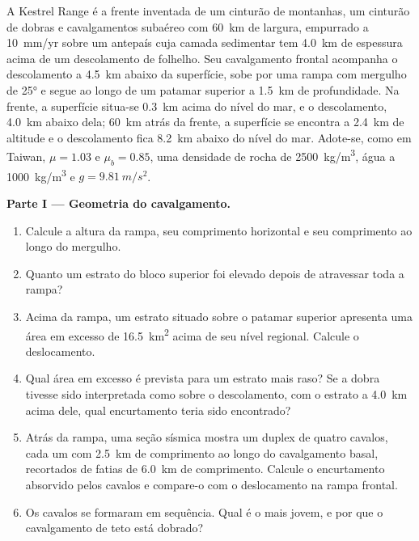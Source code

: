 \begin{problem}
\label{pb:b3:orogenic-wedges:1}
A Kestrel Range é a frente inventada de um cinturão de montanhas, um
cinturão de dobras e cavalgamentos subaéreo com \qty{60}{km} de largura, empurrado a \qty{10}{mm/yr} sobre um
antepaís cuja camada sedimentar tem \qty{4.0}{km} de espessura acima de um
descolamento de folhelho. Seu cavalgamento frontal acompanha o descolamento a \qty{4.5}{km} abaixo
da superfície, sobe por uma rampa com mergulho de \ang{25} e segue ao longo de um patamar superior
a \qty{1.5}{km} de profundidade. Na frente, a superfície situa-se \qty{0.3}{km} acima do
nível do mar, e o descolamento, \qty{4.0}{km} abaixo dela; \qty{60}{km} atrás da
frente, a superfície se encontra a \qty{2.4}{km} de altitude e o descolamento fica
\qty{8.2}{km} abaixo do nível do mar. Adote-se, como em Taiwan, $\mu = 1.03$ e $\mu_b =
0.85$, uma densidade de rocha de \qty{2500}{kg/m^3}, água a \qty{1000}{kg/m^3} e
$g = \qty{9.81}{m/s^2}$.

\medskip\noindent\textbf{Parte I --- Geometria do cavalgamento.}
\begin{enumerate}
  \item Calcule a altura da rampa, seu comprimento horizontal e seu comprimento
        ao longo do mergulho.
  \item Quanto um estrato do bloco superior foi elevado depois de atravessar
        toda a rampa?
  \item Acima da rampa, um estrato situado sobre o patamar superior apresenta uma área em excesso
        de \qty{16.5}{km^2} acima de seu nível regional. Calcule o deslocamento.
  \item Qual área em excesso é prevista para um estrato mais raso? Se a dobra tivesse sido
        interpretada como  sobre o descolamento, com o estrato
        a \qty{4.0}{km} acima dele, qual encurtamento teria sido encontrado?
  \item Atrás da rampa, uma seção sísmica mostra um duplex de quatro cavalos, cada um
        com \qty{2.5}{km} de comprimento ao longo do cavalgamento basal, recortados de fatias
        de \qty{6.0}{km} de comprimento. Calcule o encurtamento absorvido pelos cavalos e
        compare-o com o deslocamento na rampa frontal.
  \item Os cavalos se formaram em sequência. Qual é o mais jovem, e por que o
        cavalgamento de teto está dobrado?
\end{enumerate}


\end{problem}
